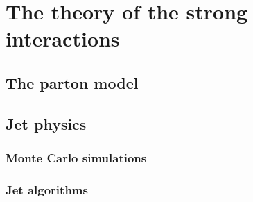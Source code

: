 %
%
\chapter{The theory of the strong interactions}

\section{The parton model}\label{sec:qcdintro}

\section{Jet physics}\label{sec:jetsintro}

\subsection{Monte Carlo simulations}

\subsection{Jet algorithms}

